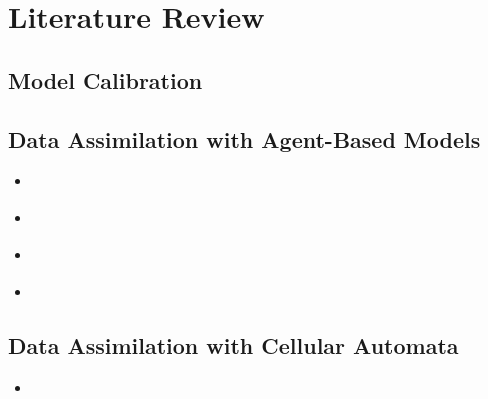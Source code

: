 \chapter{Literature Review}\label{ch:lit_rev}

\section{Model Calibration}\label{sec:lit_rev:calibration}

\section{Data Assimilation with Agent-Based Models}\label{sec:lit_rev:da_abm}

\begin{itemize}
    \item \citep{ward2016dynamic}
    \item \citep{wang2015data}
    \item \citep{rai2013behavior}
    \item \citep{}
\end{itemize}

\section{Data Assimilation with Cellular Automata}\label{sec:lit_rev:da_ca}

\begin{itemize}
    \item 
\end{itemize}

